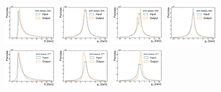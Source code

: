\documentclass[letterpaper,11pt]{article}
\begin{document}
\begin{figure}[htpb]
\centering
\includegraphics[width=0.24\textwidth]{figures/gae_mse/GNN_AE_EdgeConv_$E$.pdf}
\includegraphics[width=0.24\textwidth]{figures/gae_mse/GNN_AE_EdgeConv_$p_x$.pdf}
\includegraphics[width=0.24\textwidth]{figures/gae_mse/GNN_AE_EdgeConv_$p_y$.pdf}
\includegraphics[width=0.24\textwidth]{figures/gae_mse/GNN_AE_EdgeConv_$p_z$.pdf}\\
\includegraphics[width=0.24\textwidth]{figures/gae_sparseloss/GNN_AE_EdgeConv_$E$.pdf}
\includegraphics[width=0.24\textwidth]{figures/gae_sparseloss/GNN_AE_EdgeConv_$p_x$.pdf}
\includegraphics[width=0.24\textwidth]{figures/gae_sparseloss/GNN_AE_EdgeConv_$p_y$.pdf}

\end{figure}
\end{document}
